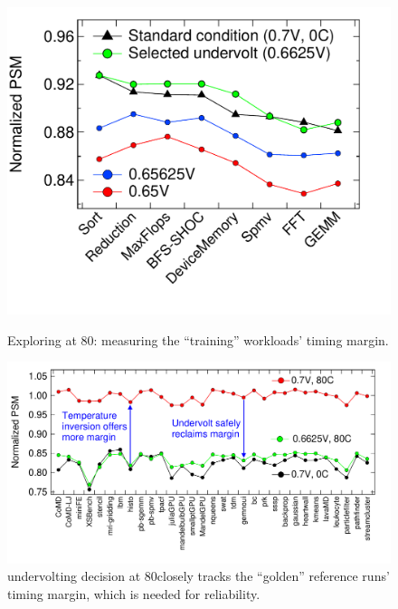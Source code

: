 \begin{figure}[t!]
  \centering
  \begin{minipage}{0.38\linewidth}
      \vspace{-0.16in}
    \centering
      \includegraphics[trim=-30 0 0 0,clip, width=0.95\linewidth]{graphs/explore-uv-shoc.pdf}
      \caption{Exploring \tistate at 80\C: measuring the ``training'' workloads' timing margin.}
      \label{fig:train-uv}
  \end{minipage}
\hfill
  \begin{minipage}{0.56\linewidth}
    \centering
        \vspace{-0.1in}
        \includegraphics[trim=0 20 30 15,clip,width=0.95\linewidth]{graphs/validate-uv.pdf}
        \caption{\tistate undervolting decision at 80\C closely tracks the ``golden'' reference runs' timing margin, which is needed for reliability.}
        \label{fig:validate-uv}
  \end{minipage}
  \vspace*{-0.1in}
\end{figure}

